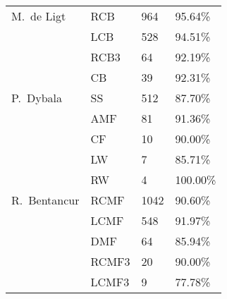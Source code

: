 \begin{table}[!htbp]
\begin{tabular}{@{}llll@{}}
M.\ de Ligt        & RCB             & 964              & 95.64\%         \\
        & LCB             & 528              & 94.51\%         \\
        & RCB3            & 64               & 92.19\%         \\
        & CB              & 39               & 92.31\%         \\
P.\ Dybala         & SS              & 512              & 87.70\%         \\
         & AMF             & 81               & 91.36\%         \\
         & CF              & 10               & 90.00\%         \\
         & LW              & 7                & 85.71\%         \\
         & RW              & 4                & 100.00\%        \\
R.\ Bentancur      & RCMF            & 1042             & 90.60\%         \\
      & LCMF            & 548              & 91.97\%         \\
      & DMF             & 64               & 85.94\%         \\
      & RCMF3           & 20               & 90.00\%         \\
      & LCMF3           & 9                & 77.78\%         \\ \bottomrule
\end{tabular}
\end{table}